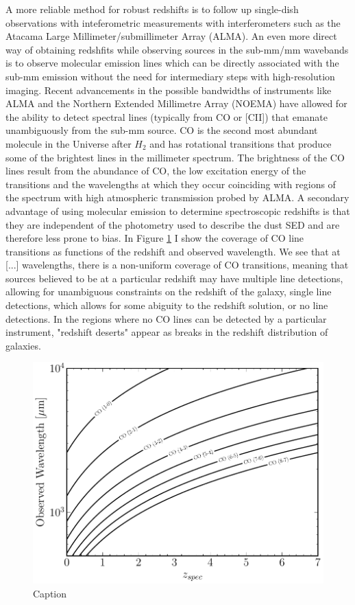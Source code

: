 A more reliable method for robust redshifts is to follow up single-dish observations with inteferometric measurements with interferometers such as the Atacama Large Millimeter/submillimeter Array (ALMA). An even more direct way of obtaining redshfits while observing sources in the sub-mm/mm wavebands is to observe molecular emission lines which can be directly associated with the sub-mm emission without the need for intermediary steps with high-resolution imaging. Recent advancements in the possible bandwidths of instruments like ALMA and the Northern Extended Millimetre Array (NOEMA) have allowed for the ability to detect spectral lines (typically from CO or [CII]) that emanate unambiguously from the sub-mm source. CO is the second most abundant molecule in the Universe after $H_2$ and has rotational transitions that produce some of the brightest lines in the millimeter spectrum. The brightness of the CO lines result from the abundance of CO, the low excitation energy of the transitions and the wavelengths at which they occur coinciding with regions of the spectrum with high atmospheric transmission probed by ALMA. A secondary advantage of using molecular emission to determine spectroscopic redshifts is that they are independent of the photometry used to describe the dust SED and are therefore less prone to bias. In Figure \ref{fig:redshift_ladder} I show the coverage of CO line transitions as functions of the redshift and observed wavelength. We see that at [...] wavelengths, there is a non-uniform coverage of CO transitions, meaning that sources believed to be at a particular redshift may have multiple line detections, allowing for unambiguous constraints on the redshift of the galaxy, single line detections, which allows for some abiguity to the redshift solution, or no line detections. In the regions where no CO lines can be detected by a particular instrument, "redshift deserts" appear as breaks in the redshift distribution of galaxies.

\begin{figure}
	\includegraphics[width=\columnwidth]{Figures/redshift_ladder.pdf}
	\caption{Caption}
	\label{fig:redshift_ladder}
\end{figure}

